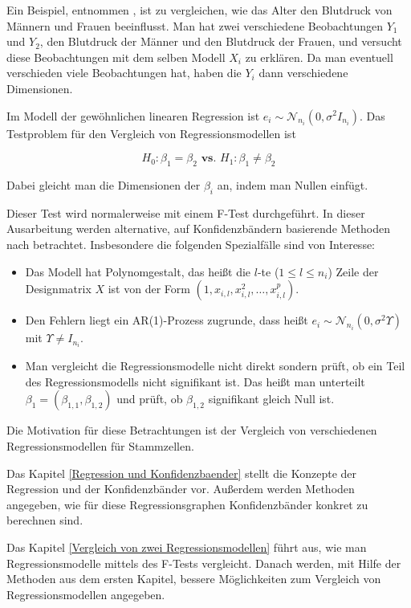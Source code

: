 \documentclass[12pt,a4paper]{article}
\theoremstyle{definition}
\theoremstyle{definition}
\theoremstyle{definition}
\theoremstyle{definition}
\begin{document}
Ein Beispiel, entnommen \cite[116]{Liu64}, ist zu vergleichen, wie das Alter den Blutdruck von Männern und Frauen beeinflusst. Man hat zwei verschiedene Beobachtungen $Y_1$ und $Y_2$, den Blutdruck der Männer und den Blutdruck der Frauen, und versucht diese Beobachtungen mit dem selben Modell $X_i$ zu erklären. Da man eventuell verschieden viele Beobachtungen hat, haben die $Y_i$ dann verschiedene Dimensionen.

Im Modell der gewöhnlichen linearen Regression ist $e_i \sim \mathscr{N}_{n_i}(0,\sigma^2 I_{n_i})$. Das Testproblem für den Vergleich von Regressionsmodellen ist

\begin{equation*}
H_{0} : \beta_{1} = \beta_{2}  \textbf{ vs. }  H_{1} : \beta_{1} \neq \beta_{2}
\end{equation*}

Dabei gleicht man die Dimensionen der $\beta_i$ an, indem man Nullen einfügt.

Dieser Test wird normalerweise mit einem F-Test durchgeführt. In dieser Ausarbeitung werden alternative, auf Konfidenzbändern basierende Methoden nach \cite{Liu64} betrachtet. Insbesondere die folgenden Spezialfälle sind von Interesse:

\begin{itemize}
\item Das Modell hat Polynomgestalt, das heißt die $l$-te ($1 \leq l \leq n_i $) Zeile der Designmatrix $X$ ist von der Form $(1, x_{i,l}, x_{i,l}^2, \ldots, x_{i,l}^p)$.
\item Den Fehlern liegt ein AR(1)-Prozess zugrunde, dass heißt $e_i \sim \mathscr{N}_{n_i}(0,\sigma^2 \Upsilon)$ mit $\Upsilon \neq I_{n_i}$.
\item Man vergleicht die Regressionsmodelle nicht direkt sondern prüft, ob ein Teil des Regressionsmodells nicht signifikant ist. Das heißt man unterteilt $\beta_1 = (\beta_{1,1}, \beta_{1,2})$ und prüft, ob $\beta_{1,2}$ signifikant gleich Null ist. 
\end{itemize} 

Die Motivation für diese Betrachtungen ist der Vergleich von verschiedenen Regressionsmodellen für Stammzellen.

Das Kapitel \ref{Regression und Konfidenzbaender} stellt die Konzepte der Regression und der Konfidenzbänder vor. Außerdem werden Methoden angegeben, wie für diese Regressionsgraphen Konfidenzbänder konkret zu berechnen sind. 

Das Kapitel \ref{Vergleich von zwei Regressionsmodellen} führt aus, wie man Regressionsmodelle mittels des F-Tests vergleicht. Danach werden, mit Hilfe der Methoden aus dem ersten Kapitel, bessere Möglichkeiten zum Vergleich von Regressionsmodellen angegeben.
\end{document}
